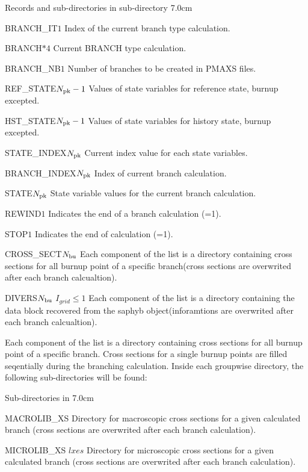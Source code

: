  
 \begin{DescriptionEnregistrement}{Records and sub-directories
 in sub-directory  }{7.0cm} \label{tabl:tabBR}
 
 \IntEnr
 {BRANCH\_IT}{$1$}
 {Index of the current branch type calculation.}
 
 \CharEnr
 {BRANCH}{$*4$}
 {Current BRANCH type calculation. } 
  
 \IntEnr
 {BRANCH\_NB}{$1$}
 {Number of branches to be created in PMAXS files.}  
 
 \RealEnr
 {REF\_STATE}{$N_{\rm pk}-1$}{ }
 {Values of state variables for reference state, burnup excepted. }
 
 \RealEnr
 {HST\_STATE}{$N_{\rm pk}-1$}{ }
 {Values of state variables for history state, burnup excepted. }
 
 \IntEnr
 {STATE\_INDEX}{$N_{\rm pk}$}
 {Current index value for each  state variables.}
 
 \IntEnr
 {BRANCH\_INDEX}{$N_{\rm pk}$}
 {Index of current  branch calculation.}
 
 \RealEnr 
 {STATE}{$N_{\rm pk}$}{ }
 {State variable values for the current branch  calculation. } 
 
 \IntEnr
 {REWIND}{$1$}
 {Indicates the end of a branch calculation (=1).}
 
 \IntEnr
 {STOP}{$1$}
 {Indicates the end of calculation (=1).}
  
  
  \DirlEnr
 {CROSS\_SECT}{$N_{\rm bu}$}
 {Each component of the list is a directory containing cross sections for all  burnup point of a specific branch(cross sections are overwrited after each branch calcualtion).}  
 
  \OptDirlEnr
 {DIVERS}{$N_{\rm bu}$} {$I_{grid} \leq 1$}
 {Each component of the list is a directory containing the  data block recovered from the saphyb object(inforamtions are overwrited after each branch calcualtion).}  
   
 \end{DescriptionEnregistrement} 
Each component of the list  is a directory containing cross sections for all  burnup point of a specific branch. Cross sections for a single burnup points are filled seqentially during the branching calculation.  Inside each groupwise directory, the following sub-directories will be found:

 \begin{DescriptionEnregistrement}{Sub-directories
 in  }{7.0cm} \label{tabl:tabXS}
  
  \DirEnr
 {MACROLIB\_XS}
 {Directory for macroscopic cross sections for a given calculated branch  (cross sections are overwrited after each branch calculation).}  
 
  \OptDirlEnr
 {MICROLIB\_XS}{} {$lxes$} 
 {Directory for microscopic cross sections for a given calculated branch (cross sections are overwrited after each branch calculation).}  
   
 \end{DescriptionEnregistrement} 
 
